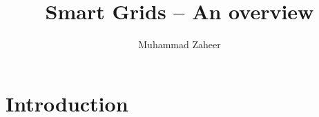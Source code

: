 \documentclass[11pt,a4paper]{article}
\begin{document}
\author{Muhammad Zaheer}
\title{Smart Grids -- An overview}
\maketitle

\section{Introduction}
\end{document}
